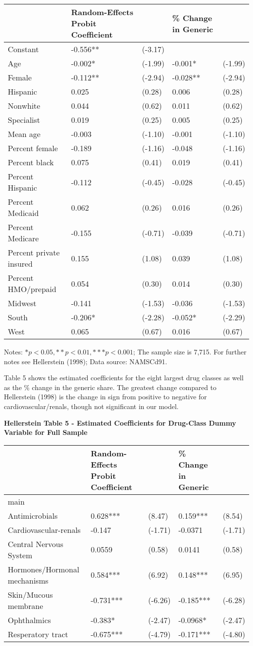 \documentclass[
]{book}
\begin{document}
\begin{longtable}[]{@{}lllll@{}}
\toprule
& Random-Effects Probit Coefficient & & \% Change in Generic
&\tabularnewline
\midrule
\endhead
Constant & -0.556** & (-3.17) & &\tabularnewline
Age & -0.002* & (-1.99) & -0.001* & (-1.99)\tabularnewline
Female & -0.112** & (-2.94) & -0.028** & (-2.94)\tabularnewline
Hispanic & 0.025 & (0.28) & 0.006 & (0.28)\tabularnewline
Nonwhite & 0.044 & (0.62) & 0.011 & (0.62)\tabularnewline
Specialist & 0.019 & (0.25) & 0.005 & (0.25)\tabularnewline
Mean age & -0.003 & (-1.10) & -0.001 & (-1.10)\tabularnewline
Percent female & -0.189 & (-1.16) & -0.048 & (-1.16)\tabularnewline
Percent black & 0.075 & (0.41) & 0.019 & (0.41)\tabularnewline
Percent Hispanic & -0.112 & (-0.45) & -0.028 & (-0.45)\tabularnewline
Percent Medicaid & 0.062 & (0.26) & 0.016 & (0.26)\tabularnewline
Percent Medicare & -0.155 & (-0.71) & -0.039 & (-0.71)\tabularnewline
Percent private insured & 0.155 & (1.08) & 0.039 & (1.08)\tabularnewline
Percent HMO/prepaid & 0.054 & (0.30) & 0.014 & (0.30)\tabularnewline
Midwest & -0.141 & (-1.53) & -0.036 & (-1.53)\tabularnewline
South & -0.206* & (-2.28) & -0.052* & (-2.29)\tabularnewline
West & 0.065 & (0.67) & 0.016 & (0.67)\tabularnewline
\bottomrule
\end{longtable}

Notes: \(*p < 0.05, **p < 0.01, ***p < 0.001\); The sample size is
7,715. For further notes see Hellerstein (1998); Data source: NAMSCd91.

Table 5 shows the estimated coefficients for the eight largest drug
classes as well as the \% change in the generic share. The greatest
change compared to Hellerstein (1998) is the change in sign from
positive to negative for cardiovascular/renals, though not significant
in our model.

\textbf{Hellerstein Table 5 - Estimated Coefficients for Drug-Class
Dummy Variable for Full Sample}

\begin{longtable}[]{@{}lllll@{}}
\toprule
& Random-Effects Probit Coefficient & & \% Change in Generic
&\tabularnewline
\midrule
\endhead
main & & & &\tabularnewline
Antimicrobials & 0.628*** & (8.47) & 0.159*** & (8.54)\tabularnewline
Cardiovascular-renals & -0.147 & (-1.71) & -0.0371 &
(-1.71)\tabularnewline
Central Nervous System & 0.0559 & (0.58) & 0.0141 &
(0.58)\tabularnewline
Hormones/Hormonal mechanisms & 0.584*** & (6.92) & 0.148*** &
(6.95)\tabularnewline
Skin/Mucous membrane & -0.731*** & (-6.26) & -0.185*** &
(-6.28)\tabularnewline
Ophthalmics & -0.383* & (-2.47) & -0.0968* & (-2.47)\tabularnewline
Resperatory tract & -0.675*** & (-4.79) & -0.171*** &
(-4.80)\tabularnewline
\bottomrule
\end{longtable}
\end{document}
